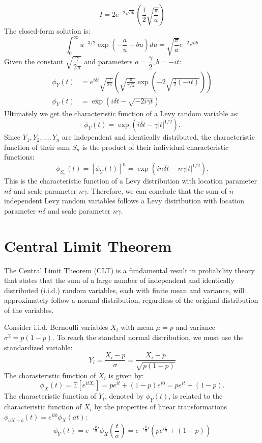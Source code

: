 \documentclass[12pt]{article}
\begin{document}
\begin{singlespace}
\begin{equation}
I = 2e^{-2\sqrt{ab}} \left( \frac{1}{2} \sqrt{\frac{\pi}{a}} \right)
\end{equation}
The closed-form solution is:
\begin{equation}
\int_{0}^{\infty} u^{-3/2} \exp\left(-\frac{a}{u} - bu\right) du = \sqrt{\frac{\pi}{a}} e^{-2\sqrt{ab}}
\end{equation}
Given the constant $\sqrt{\dfrac{\gamma}{2\pi}}$ and parameters $a = \dfrac{\gamma}{2}, b = -it$:
\begin{align}
\phi_Y(t) &= e^{i\delta t} \sqrt{\frac{\gamma}{2\pi}} \left( \sqrt{\frac{\pi}{\gamma/2}} \exp\left(-2\sqrt{\frac{\gamma}{2}(-it)}\right) \right) \\
\phi_Y(t) &= \exp\left(i\delta t - \sqrt{-2i\gamma t}\right)
\end{align}
Ultimately we get the characteristic function of a Levy random variable as:
\[
\phi_Y(t) = \exp\left(i\delta t - \gamma |t|^{1/2}\right).
\]
Since $Y_1, Y_2, ..., Y_n$ are independent and identically distributed, the characteristic function of their sum $S_n$ is the product of their individual characteristic functions:
\[
\phi_{S_n}(t) = [\phi_Y(t)]^n = \exp\left(i n\delta t - n\gamma |t|^{1/2}\right).
\]
This is the characteristic function of a Levy distribution with location parameter $n\delta$ and scale parameter $n\gamma$. Therefore, we can conclude that the sum of $n$ independent Levy random variables follows a Levy distribution with location parameter $n\delta$ and scale parameter $n\gamma$.

\section{Central Limit Theorem}
The Central Limit Theorem (CLT) is a fundamental result in probability theory that states that the sum of a large number of independent and identically distributed (i.i.d.) random variables, each with finite mean and variance, will approximately follow a normal distribution, regardless of the original distribution of the variables. 

Consider i.i.d. Bernoulli variables $X_i$ with mean $\mu = p$ and variance $\sigma^2 = p(1-p)$. To reach the standard normal distribution, we must use the standardized variable:
\begin{equation}
Y_i = \frac{X_i - p}{\sigma} = \frac{X_i - p}{\sqrt{p(1-p)}}
\end{equation}
The charasteristic function of $X_i$ is given by:
\[
\phi_X(t) = \mathbb{E}[e^{itX_i}] = p e^{it} + (1-p) e^{i0} = p e^{it} + (1-p).
\]
The characteristic function of $Y_i$, denoted by $\phi_{Y}(t)$, is related to the characteristic function of $X_i$ by the properties of linear transformations $\phi_{aX+b}(t) = e^{itb}\phi_X(at)$:
\begin{equation}
\phi_{Y}(t) = e^{-i\frac{p}{\sigma}t} \phi_{X}\left(\frac{t}{\sigma}\right) = e^{-i\frac{p}{\sigma}t} \left( p e^{i\frac{t}{\sigma}} + (1-p) \right)
\end{equation}


\end{singlespace}
\end{document}
